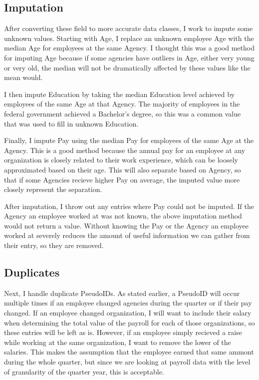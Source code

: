 \documentclass{article}
\begin{document}
    \subsection{Imputation}
    After converting these field to more accurate data classes, I work to impute some unknown values. Starting with Age, I replace an unknown employee Age with the median Age for employees at the same Agency. I thought this was a good method for imputing Age because if some agencies have outliers in Age, either very young or very old, the median will not be dramatically affected by these values like the mean would.
    \par
    I then impute Education by taking the median Education level achieved by employees of the same Age at that Agency. The majority of employees in the federal government achieved a Bachelor's degree, so this was a common value that was used to fill in unknown Education.
    \par
    Finally, I impute Pay using the median Pay for employees of the same Age at the Agency. This is a good method because the annual pay for an employee at any organization is closely related to their work experience, which can be loosely approximated based on their age. This will also separate based on Agency, so that if some Agencies recieve higher Pay on average, the imputed value more closely represent the separation.
    \par
    After imputation, I throw out any entries where Pay could not be imputed. If the Agency an employee worked at was not known, the above imputation method would not return a value. Without knowing the Pay or the Agency an employee worked at severely reduces the amount of useful information we can gather from their entry, so they are removed.

    \subsection{Duplicates}
    Next, I handle duplicate PseudoIDs. As stated earlier, a PseudoID will occur multiple times if an employee changed agencies during the quarter or if their pay changed. If an employee changed organization, I will want to include their salary when determining the total value of the payroll for each of those organizations, so these entries will be left as is. However, if an employee simply recieved a raise while working at the same organization, I want to remove the lower of the salaries. This makes the assumption that the employee earned that same ammont during the whole quarter, but since we are looking at payroll data with the level of granularity of the quarter year, this is acceptable.
\end{document}
